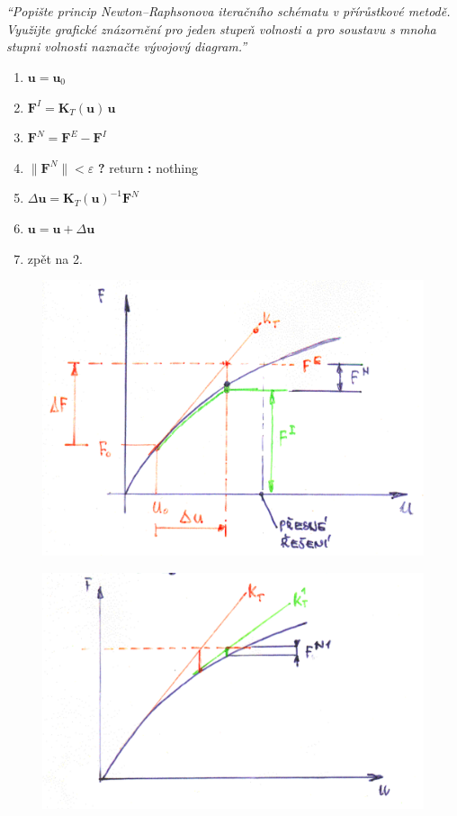 \documentclass{article}
\begin{document}
	\section{}
	\emph{``Popište princip Newton–Raphsonova iteračního schématu v přírůstkové metodě. Využijte grafické znázornění pro jeden stupeň volnosti a pro soustavu s mnoha stupni volnosti naznačte vývojový diagram.''}
	\begin{enumerate}
		\item $\bm{u} = \bm{u}_0$
		\item 	$\bm{F}^I = \bm{K}_T(\bm{u})\,\bm{u}$
		\item $\bm{F}^N = \bm{F}^E - \bm{F}^I$
		\item $\|\bm{F}^N\| < \varepsilon$ \textbf{?} return \textbf{:} nothing
		\item $\Delta \bm{u} = \bm{K}_T(\bm{u})^{-1} \bm{F}^N$
		\item $\bm{u} = \bm{u} + \Delta \bm{u}$
		\item zpět na 2.
	\end{enumerate}
	\begin{figure}
		\centering
		\includegraphics[width=.5\linewidth]{NR1.png}
	\end{figure}
	\begin{figure}
		\centering
		\includegraphics[width=.5\linewidth]{NR2.png}
	\end{figure}
\end{document}
